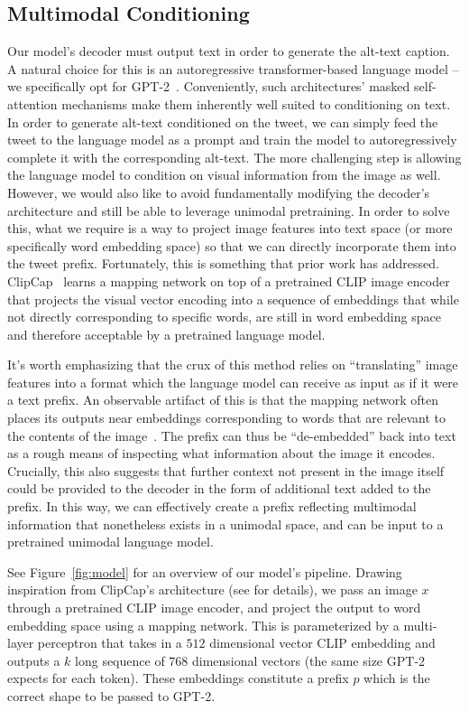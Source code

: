 \documentclass{article} %
\begin{document}
\subsection{Multimodal Conditioning}

Our model's decoder must output text in order to generate the alt-text caption.
A natural choice for this is an autoregressive transformer-based language model -- we specifically opt for GPT-2~\citep{gpt2}.
Conveniently, such architectures' masked self-attention mechanisms make them inherently well suited to conditioning on text.
In order to generate alt-text conditioned on the tweet, we can simply feed the tweet to the language model as a prompt and train the model to autoregressively complete it with the corresponding alt-text.
The more challenging step is allowing the language model to condition on visual information from the image as well.
However, we would also like to avoid fundamentally modifying the decoder's architecture and still be able to leverage unimodal pretraining.
In order to solve this, what we require is a way to project image features into text space (or more specifically word embedding space) so that we can directly incorporate them into the tweet prefix.
Fortunately, this is something that prior work has addressed.
ClipCap~\citep{clipcap} learns a mapping network on top of a pretrained CLIP image encoder that projects the visual vector encoding into a sequence of embeddings that while not directly corresponding to specific words, are still in word embedding space and therefore acceptable by a pretrained language model.

It's worth emphasizing that the crux of this method relies on ``translating'' image features into a format which the language model can receive as input as if it were a text prefix.
An observable artifact of this is that the mapping network often places its outputs near embeddings corresponding to words that are relevant to the contents of the image~\citep{clipcap}.
The prefix can thus be ``de-embedded'' back into text as a rough means of inspecting what information about the image it encodes.
Crucially, this also suggests that further context not present in the image itself could be provided to the decoder in the form of additional text added to the prefix.
In this way, we can effectively create a prefix reflecting multimodal information that nonetheless exists in a unimodal space, and can be input to a pretrained unimodal language model.

See Figure~\ref{fig:model} for an overview of our model's pipeline.
Drawing inspiration from ClipCap's architecture (see \citet{clipcap} for details), we pass an image $x$ through a pretrained CLIP image encoder, and project the output to word embedding space using a mapping network.
This is parameterized by a multi-layer perceptron that takes in a $512$ dimensional vector CLIP embedding and outputs a $k$ long sequence of $768$ dimensional vectors (the same size GPT-2 expects for each token).
These embeddings constitute a prefix $p$ which is the correct shape to be passed to GPT-2.
\end{document}
